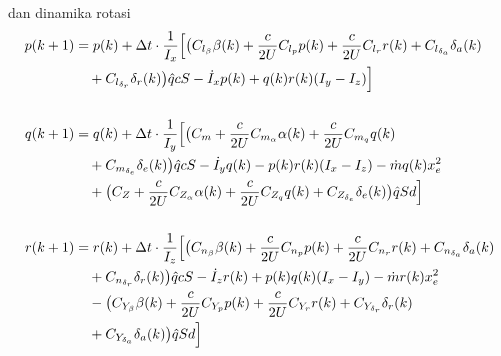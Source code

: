 

dan dinamika rotasi
\begin{align}
    p(k+1) &= p(k) + \Delta t \cdot \frac{1}{I_x}\Bigl[\bigl(C_{l_{\beta}}\beta(k)+\frac{c}{2U}C_{l_p}p(k)+\frac{c}{2U}C_{l_r}r(k)+C_{l_{\delta_a}}\delta_a(k) \notag \\
    &\quad +C_{l_{\delta_r}}\delta_r(k)\bigr)\hat{q}cS-\Dot{I}_xp(k)+q(k)r(k)(I_y-I_z)\Bigr] \\
    \notag \\
    q(k+1) &= q(k) + \Delta t \cdot \frac{1}{I_y}\Bigl[\bigl(C_m+\frac{c}{2U}C_{m_{\alpha}}\alpha(k)+\frac{c}{2U}C_{m_q}q(k) \notag \\ 
    &\quad +C_{m_{\delta_e}}\delta_e(k)\bigr)\hat{q}cS-\Dot{I}_yq(k)-p(k)r(k)(I_x-I_z)-\Dot{m}q(k)x_e^2 \notag \\
    &\quad + \bigl(C_Z+\frac{c}{2U}C_{Z_{\alpha}}\alpha(k)+\frac{c}{2U}C_{Z_q}q(k)+C_{Z_{\delta_e}}\delta_e(k)\bigr)\hat{q}S d \Bigr]  \\
    \notag \\
    r(k+1) &= r(k) + \Delta t \cdot \frac{1}{I_z}\Bigl[\bigl(C_{n_{\beta}}\beta(k)+\frac{c}{2U}C_{n_p}p(k)+\frac{c}{2U}C_{n_r}r(k)+C_{n_{\delta_a}}\delta_a(k) \notag \\ 
    &\quad +C_{n_{\delta_r}}\delta_r(k)\bigr)\hat{q}cS-\Dot{I}_zr(k)+p(k)q(k)(I_x-I_y)-\Dot{m}r(k)x_e^2 \notag \\ 
    &\quad -\bigl(C_{Y_{\beta}}\beta(k) + \frac{c}{2U}C_{Y_p}p(k)+\frac{c}{2U}C_{Y_r}r(k)+C_{Y_{\delta_r}}\delta_r(k) \notag \\
    &\quad +C_{Y_{\delta_a}}\delta_a(k)\bigr)\hat{q}Sd\Bigr]
\end{align}
 
